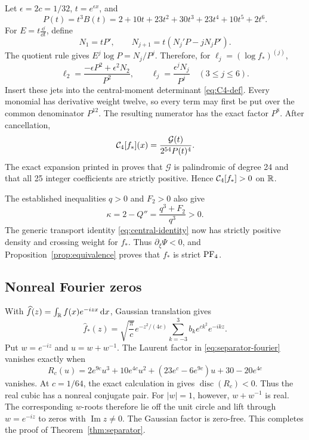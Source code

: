 Let \(\epsilon=2c=1/32\), \(t=e^{\epsilon x}\), and
\[
 P(t)=t^3B(t)=2+10t+23t^2+30t^3+23t^4+10t^5+2t^6.
\]
For \(E=t\frac{\dd}{\dd t}\), define
\begin{equation}\label{eq:separator-N-recurrence}
 N_1=tP',\qquad N_{j+1}=t(N_j'P-jN_jP').
\end{equation}
The quotient rule gives \(E^j\log P=N_j/P^j\). Therefore, for
\(\ell_j=(\log f_*)^{(j)}\),
\begin{equation}\label{eq:separator-logjets}
 \ell_2=\frac{-\epsilon P^2+\epsilon^2N_2}{P^2},
 \qquad
 \ell_j=\frac{\epsilon^jN_j}{P^j}\quad(3\leq j\leq6).
\end{equation}
Insert these jets into the central-moment determinant
\eqref{eq:C4-def}. Every monomial has derivative weight twelve, so every
term may first be put over the common denominator \(P^{12}\). The resulting
numerator has the exact factor \(P^8\). After cancellation,
\begin{equation}\label{eq:separator-c4}
 \mathcal{C}_4[f_*](x)=\frac{\mathcal G(t)}{2^{54}P(t)^4}.
\end{equation}
The exact expansion printed in  proves that
\(\mathcal G\) is palindromic of degree 24 and that all 25 integer
coefficients are strictly positive. Hence \(\mathcal{C}_4[f_*]>0\) on \(\mathbb{R}\).

The established inequalities \(q>0\) and \(F_2>0\) also give
\[
 \kappa=2-Q''=\frac{q^3+F_2}{q^3}>0.
\]
The generic transport identity \eqref{eq:central-identity} now has strictly
positive density and crossing weight for \(f_*\).  Thus
\(\partial_\xi\Psi<0\), and Proposition~\ref{prop:equivalence} proves that
\(f_*\) is strict \(\mathrm{PF}_4\).

\subsection{Nonreal Fourier zeros}

With \(\widehat f(z)=\int_{\mathbb{R}} f(x)e^{-izx}\,\mathrm{d} x\), Gaussian translation gives
\begin{equation}\label{eq:separator-fourier}
 \widehat f_*(z)=\sqrt{\frac{\pi}{c}}e^{-z^2/(4c)}
 \sum_{k=-3}^{3}b_ke^{ck^2}e^{-ikz}.
\end{equation}
Put \(w=e^{-iz}\) and \(u=w+w^{-1}\).  The Laurent factor in
\eqref{eq:separator-fourier} vanishes exactly when
\begin{equation}\label{eq:separator-cubic}
 R_c(u)=2e^{9c}u^3+10e^{4c}u^2
 +(23e^c-6e^{9c})u+30-20e^{4c}
\end{equation}
vanishes. At \(c=1/64\), the exact calculation in
 gives \(\operatorname{disc}(R_c)<0\). Thus the real
cubic has a nonreal conjugate pair.
For \(|w|=1\), however, \(w+w^{-1}\) is real. The corresponding \(w\)-roots
therefore lie off the unit circle and lift through \(w=e^{-iz}\) to zeros
with \(\operatorname{Im}z\neq0\). The Gaussian factor is zero-free. This
completes the proof of Theorem~\ref{thm:separator}.
